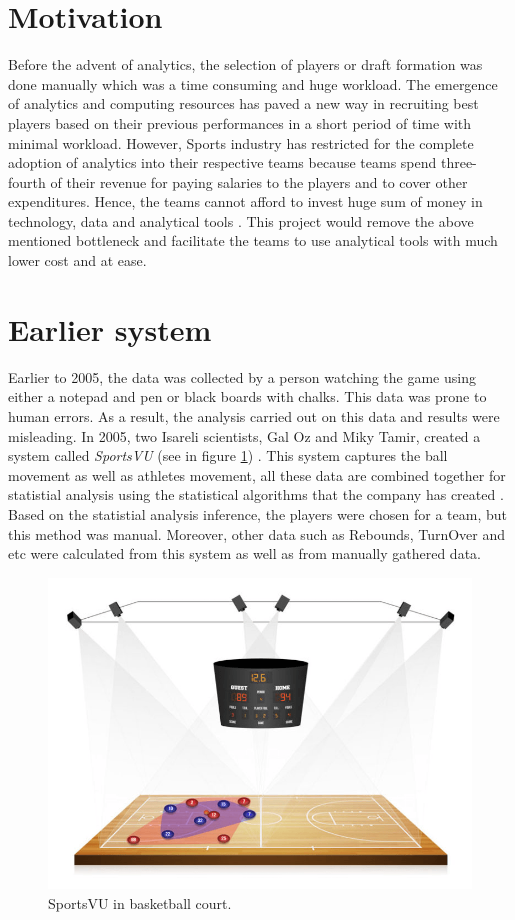 \documentclass[format=sigconf]{acmart}
\begin{document}
\section{Motivation}
Before the advent of analytics, the selection of players or draft formation was done manually which was a time consuming and huge 
workload. The emergence of analytics and computing resources has paved a new way in recruiting best players based on their previous
performances in a short period of time with minimal workload. However, Sports industry has restricted for the complete adoption of 
analytics into their respective teams because teams spend three-fourth of their revenue for paying salaries to the players
and to cover other expenditures. Hence, the teams cannot afford to invest huge sum of money in technology, data and analytical 
tools  \cite{davenport2014analytics}. This project would remove the above mentioned bottleneck and facilitate the teams to use 
analytical tools with much lower cost and at ease. 

\section{Earlier system}
Earlier to 2005, the data was collected by a person watching the game using either a notepad and pen or black boards with chalks.
This data was prone to human errors. As a result, the analysis carried out on this data and results were misleading.
In 2005, two Isareli scientists, Gal Oz and Miky Tamir, created a system called \textit{SportsVU} (see in figure \ref{fig:SportsVU})
\cite{mccann2012player} \cite{warsaw}. This
system captures the ball movement as well as athletes movement, all these data are combined together for statistial analysis using 
the statistical algorithms that the company has created \cite{warriors}.
Based on the statistial analysis inference, the players were chosen for a team, but this method was manual. Moreover, other data such 
as Rebounds, TurnOver and etc were calculated from this system as well as from manually gathered data.

\begin{figure}[H]
    \centering
    \includegraphics[scale=0.20]{STATS-SportVU-technology.png}
    \caption{SportsVU in basketball court.}
    \label{fig:SportsVU}
\end{figure}
\end{document}
